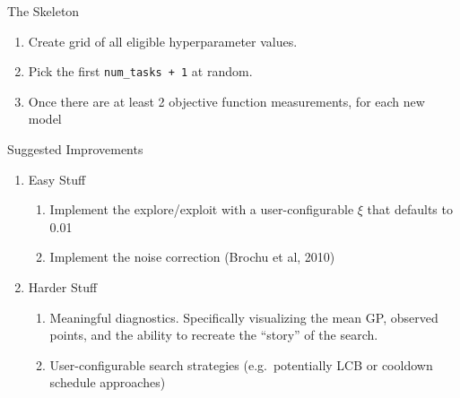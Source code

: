 \documentclass[10pt,ignorenonframetext,]{beamer}
\providecommand{\tightlist}{%
  \setlength{\itemsep}{0pt}\setlength{\parskip}{0pt}}
\begin{document}
\begin{frame}[fragile]{The Skeleton}
\protect\hypertarget{the-skeleton}{}

\begin{enumerate}
\tightlist
\item
  Create grid of all eligible hyperparameter values.
\item
  Pick the first \texttt{num\_tasks\ +\ 1} at random.
\item
  Once there are at least 2 objective function measurements, for each
  new model

\end{enumerate}

\end{frame}

\begin{frame}{Suggested Improvements}
\protect\hypertarget{suggested-improvements}{}

\begin{enumerate}
\tightlist
\item
  Easy Stuff

  \begin{enumerate}
  \tightlist
  \item
    Implement the explore/exploit with a user-configurable \(\xi\) that
    defaults to 0.01
  \item
    Implement the noise correction (Brochu et al, 2010)
  \end{enumerate}
\item
  Harder Stuff

  \begin{enumerate}
  \tightlist
  \item
    Meaningful diagnostics. Specifically visualizing the mean GP,
    observed points, and the ability to recreate the ``story'' of the
    search.
  \item
    User-configurable search strategies (e.g.~potentially LCB or
    cooldown schedule approaches)
  \end{enumerate}
\end{enumerate}

\end{frame}
\end{document}
